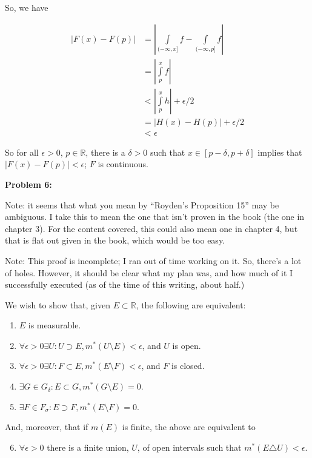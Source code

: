 \documentclass[a4paper,12pt]{article}
\newcommand{\shunt}{\vspace{20mm}}
\newcommand{\absval}[1]{\left\lvert #1 \right\rvert}
\newcommand{\de}{\delta}
\newcommand{\ep}{\epsilon}
\newcommand{\si}{\sigma}
\newcommand{\R}{\mathbb{R}}
\begin{document}
So, we have

\begin{align*}
\absval{F(x)-F(p)} &= \absval{\int\limits_{(-\infty,x]} f - \int\limits_{(-\infty,p]} f} \\
&=\absval{\int\limits_p^x f} \\
&<\absval{\int\limits_p^x h} + \ep/2 \\
&=\absval{H(x)-H(p)} + \ep/2\\
&< \ep
\end{align*}

So for all $\ep>0$, $p \in \R$, there is a $\de >0$ such that $x \in [p-\de, p+\de]$ implies that $\absval{F(x)-F(p)} < \ep$; $F$ is continuous.

\shunt

{\bf Problem 6:}

Note: it seems that what you mean by ``Royden's Proposition 15'' may be ambiguous. I take this to mean the one that isn't proven in the book (the one in chapter 3). For the content covered, this could also mean one in chapter 4, but that is flat out given in the book, which would be too easy.

Note: This proof is incomplete; I ran out of time working on it. So, there's a lot of holes. However, it should be clear what my plan was, and how much of it I successfully executed (as of the time of this writing, about half.)

We wish to show that, given $E \subset \R$, the following are equivalent:

\begin{enumerate}
\item $E$ is measurable.
\item $\forall \ep >0 \exists U: U \supset E, m^*(U \setminus E) < \ep$, and $U$ is open.
\item $\forall \ep >0 \exists U: F \subset E, m^*(E \setminus F) < \ep$, and $F$ is closed.
\item $\exists G \in G_\de : E \subset G, m^*(G \setminus E) = 0$.
\item $\exists F \in F_\si : E \supset F, m^*(E \setminus F) = 0$.
\end{enumerate}

And, moreover, that if $m(E)$ is finite, the above are equivalent to

\begin{enumerate}
\setcounter{enumi}{5}
\item $\forall \ep >0$ there is a finite union, $U$, of open intervals such that $m^*(E \triangle U) < \ep$.
\end{enumerate}
\end{document}
